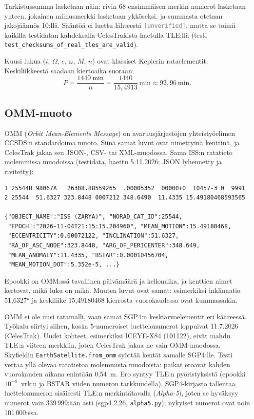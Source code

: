 \documentclass[a4paper,11pt]{article}
\newcommand{\unverified}[1][]{\textcolor{gray}{\texttt{[unverified#1]}}}
\newcommand{\koodi}[1]{\texttt{#1}}
\begin{document}
Tarkistussumma lasketaan näin: rivin 68 ensimmäisen merkin numerot lasketaan yhteen, jokainen miinusmerkki lasketaan ykköseksi, ja summasta otetaan jakojäännös 10:llä. Sääntöä ei luettu lähteestä \unverified, mutta se toimii kaikilla testidatan kahdeksalla CelesTrakista haetulla TLE:llä (testi \koodi{test\_checksums\_of\_real\_tles\_are\_valid}).

Kuusi lukua ($i$, $\Omega$, $e$, $\omega$, $M$, $n$) ovat klassiset Keplerin rataelementit. Keskiliikkeestä saadaan kiertoaika suoraan:
\[
P = \frac{1440\ \text{min}}{n} = \frac{1440}{15,4913}\ \text{min} \approx 92,96\ \text{min}.
\]

\subsection{OMM-muoto}\label{sec:omm}

OMM (\emph{Orbit Mean-Elements Message}) on avaruusjärjestöjen yhteistyöelimen CCSDS:n
standardoima muoto. Siinä samat luvut ovat nimettyinä kenttinä, ja CelesTrak jakaa sen
JSON-, CSV- tai XML-muodossa. Sama ISS:n ratatieto molemmissa muodoissa (testidata, haettu
5.11.2026; JSON lyhennetty ja rivitetty):
{\small
\begin{verbatim}
1 25544U 98067A   26308.88559265  .00005352  00000+0  10457-3 0  9991
2 25544  51.6327 323.8448 0007212 348.6490  11.4335 15.49180468593565

{"OBJECT_NAME":"ISS (ZARYA)", "NORAD_CAT_ID":25544,
 "EPOCH":"2026-11-04T21:15:15.204960", "MEAN_MOTION":15.49180468,
 "ECCENTRICITY":0.00072122, "INCLINATION":51.6327,
 "RA_OF_ASC_NODE":323.8448, "ARG_OF_PERICENTER":348.649,
 "MEAN_ANOMALY":11.4335, "BSTAR":0.00010456704,
 "MEAN_MOTION_DOT":5.352e-5, ...}
\end{verbatim}
}
\noindent Epookki on OMM:ssä tavallinen päivämäärä ja kellonaika, ja kenttien nimet
kertovat, mikä luku on mikä. Muuten luvut ovat samat: esimerkiksi inklinaatio 51,6327° ja
keskiliike 15,49180468 kierrosta vuorokaudessa ovat kummassakin.

OMM ei ole uusi ratamalli, vaan samat SGP4:n keskiarvoelementit eri kääreessä. Työkalu
siirtyi siihen, koska 5-numeroiset luettelonumerot loppuivat 11.7.2026 (CelesTrak). Uudet
kohteet, esimerkiksi ICEYE-X84 (101122), eivät mahdu TLE:n viiteen merkkiin, joten
CelesTrak jakaa ne vain OMM-muodossa. Skyfieldin \koodi{EarthSatellite.from\_omm} syöttää
kentät samalle SGP4:lle. Testi vertaa yllä olevaa ratatietoa molemmista muodoista: paikat
eroavat kahden vuorokauden aikana enintään 0,54~m. Ero syntyy TLE:n pyöristyksistä
(epookki $10^{-8}$~vrk:n ja BSTAR viiden numeron tarkkuudella). SGP4-kirjasto tallentaa
luettelonumeron sisäisesti TLE:n merkintätavalla (\emph{Alpha-5}), joten se hyväksyy
numerot vain 339\,999:ään asti (sgp4 2.26, \koodi{alpha5.py}); nykyiset numerot ovat noin
101\,000:ssa.
\end{document}
